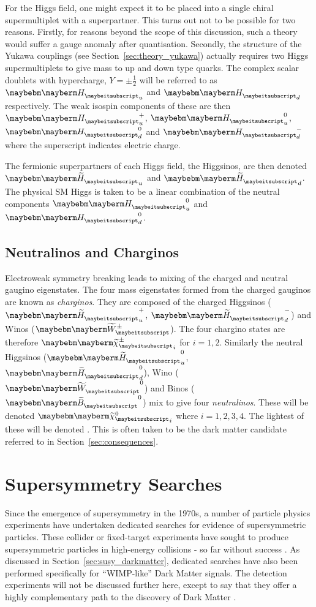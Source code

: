 For the Higgs field, one might expect it to be placed into a single chiral
supermultiplet with a \spinhalf superpartner. This turns out not to be possible
for two reasons. Firstly, for reasons beyond the scope of this discussion, such
a theory would suffer a gauge anomaly after quantisation. Secondly, the
structure of the Yukawa couplings (see Section~\ref{sec:theory_yukawa}) actually
requires two Higgs supermultiplets to give mass to up and down type quarks. The
complex scalar doublets with hypercharge, $Y=\pm\frac{1}{2}$ will be referred to
as $\PHiggs_u$ and $\PHiggs_d$ respectively. The weak isospin components of
these are then $\PHiggs_u^+$, $\PHiggs_u^0$, $\PHiggs_d^0$ and $\PHiggs_d^-$
where the superscript indicates electric charge.

The fermionic superpartners of each Higgs field, the Higgsinos, are then denoted
$\PSHiggs_u$ and $\PSHiggs_d$. The physical \ac{SM} Higgs is taken to be a
linear combination of the neutral components $\PHiggs_u^0$ and $\PHiggs_d^0$.




\subsection{Neutralinos and Charginos}
Electroweak symmetry breaking leads to mixing of the charged and neutral gaugino
eigenstates. The four mass eigenstates formed from the charged gauginos are
known as \emph{charginos}. They are composed of the charged Higgsinos
($\PSHiggs_u^+$, $\PSHiggs_d^-$) and Winos ($\PSWpm$). The four chargino states
are therefore $\PScharginopm_i$ for $i=1,2$. Similarly the neutral Higgsinos
($\PSHiggs_u^0$, $\PSHiggs_d^0$), Wino ($\PSW^0$) and Binos ($\PSB^0$) mix to
give four \emph{neutralinos}. These will be denoted $\PSneutralino_i$ where
$i=1,2,3,4$. The lightest of these will be denoted \PSneutralino. This is often
taken to be the dark matter candidate referred to in
Section~\ref{sec:consequences}.

\section{Supersymmetry Searches}
Since the emergence of supersymmetry in the 1970s, a number of particle physics
experiments have undertaken dedicated searches for evidence of supersymmetric
particles. These collider or fixed-target experiments have sought to produce
supersymmetric particles in high-energy collisions - so far without success
\cite{ua1_susy, aleph_susy, d0_susy, hera_susy}. As discussed in
Section~\ref{sec:susy_darkmatter}, dedicated searches have also been performed
specifically for ``\ac{WIMP}-like'' Dark Matter signals. The detection
experiments will not be discussed further here, except to say that they offer a
highly complementary path to the discovery of Dark Matter
\cite{mastercode_2011}.

